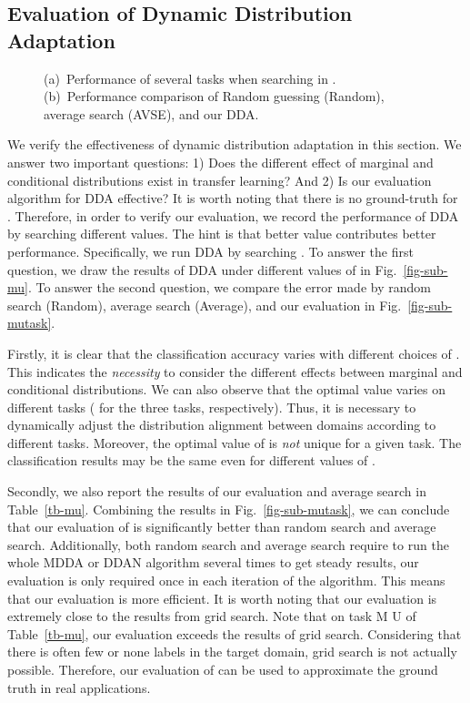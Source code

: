 \documentclass[acmsmall]{acmart}
\begin{document}
\subsection{Evaluation of Dynamic Distribution Adaptation}

\begin{figure*}[t!]
	\centering
	\vspace{-.2in}
	\caption{(a)~Performance of several tasks when searching  in . (b)~Performance comparison of Random guessing (Random), average search (AVSE), and our DDA.}
	\label{fig-mu2}
	\vspace{-.2in}
\end{figure*}

We verify the effectiveness of dynamic distribution adaptation in this section. We answer two important questions: 1) Does the different effect of marginal and conditional distributions exist in transfer learning? And 2) Is our evaluation algorithm for DDA effective? It is worth noting that there is no ground-truth for . Therefore, in order to verify our evaluation, we record the performance of DDA by searching different  values. The hint is that better  value contributes better performance. Specifically, we run DDA by searching . To answer the first question, we draw the results of DDA under different values of  in Fig.~\ref{fig-sub-mu}. To answer the second question, we compare the error made by random search (Random), average search (Average), and our evaluation in Fig.~\ref{fig-sub-mutask}.  

Firstly, it is clear that the classification accuracy varies with different choices of . This indicates the \textit{necessity} to consider the different effects between marginal and conditional distributions. We can also observe that the optimal  value varies on different tasks ( for the three tasks, respectively). Thus, it is necessary to dynamically adjust the distribution alignment between domains according to different tasks. Moreover, the optimal value of  is \textit{not} unique for a given task. The classification results may be the same even for different values of .

Secondly, we also report the results of our evaluation and average search in Table~\ref{tb-mu}. Combining the results in Fig.~\ref{fig-sub-mutask}, we can conclude that our evaluation of  is significantly better than random search and average search. Additionally, both random search and average search require to run the whole MDDA or DDAN algorithm several times to get steady results, our evaluation is only required once in each iteration of the algorithm. This means that our evaluation is more efficient. It is worth noting that our evaluation is extremely close to the results from grid search. Note that on task M  U of Table~\ref{tb-mu}, our evaluation exceeds the results of grid search. Considering that there is often few or none labels in the target domain, grid search is not actually possible. Therefore, our evaluation of  can be used to approximate the ground truth in real applications. 
\end{document}

